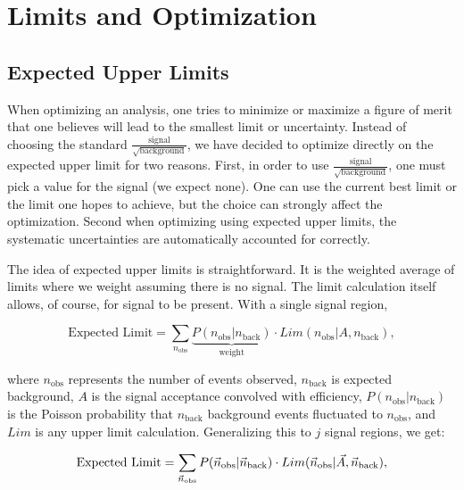 \section{Limits and Optimization}
\label{section:limitsandoptimization}

\subsection{Expected Upper Limits}
\label{section:expectedlimits}

When optimizing an analysis, one tries to minimize or maximize a
figure of merit that one believes will lead to the smallest limit or
uncertainty.  Instead of choosing the standard
$\frac{\textrm{signal}}{\sqrt{\textrm{background}}}$, we have decided
to optimize directly on the expected upper limit for two reasons.
First, in order to use
$\frac{\textrm{signal}}{\sqrt{\textrm{background}}}$, one must pick a
value for the signal (we expect none).  One can use the current best
limit or the limit one hopes to achieve, but the choice can strongly
affect the optimization. Second when optimizing using expected upper
limits, the systematic uncertainties are automatically accounted for
correctly.

The idea of expected upper limits is straightforward.  It is the
weighted average of limits where we weight assuming there is no
signal.  The limit calculation itself allows, of course, for signal to
be present.  With a single signal region,

\begin{equation}
  \text{Expected Limit} =\sum\limits_{n_\text{obs}} \underbrace{P(n_\text{obs}|n_\text{back})}_\textrm{weight}\cdot Lim(n_\text{obs}|A,n_\text{back}),
\end{equation}

where $n_\text{obs}$ represents the number of events observed,
$n_\text{back}$ is expected background, $A$ is the signal acceptance
convolved with efficiency, $P(n_\text{obs}|n_\text{back})$ is the
Poisson probability that $n_\text{back}$ background events fluctuated
to $n_\text{obs}$, and $Lim$ is any upper limit calculation.
Generalizing this to $j$ signal regions, we get:

\begin{equation}
  \label {eqn:expectedlimit}
  \text{Expected Limit} =\sum\limits_{\xobs} P(\xobs|\vec{n}_\text{back})\cdot Lim(\xobs|\vec{A},\vec{n}_\text{back}),
\end{equation}

